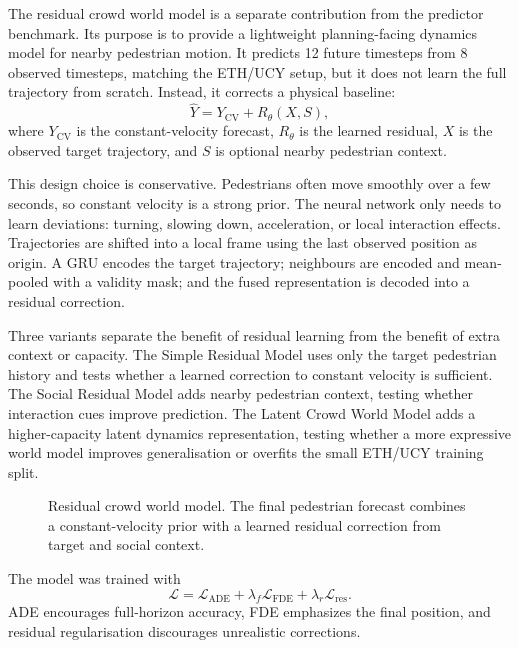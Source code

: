 \documentclass[conference]{IEEEtran}
\begin{document}
The residual crowd world model is a separate contribution from the predictor
benchmark. Its purpose is to provide a lightweight planning-facing dynamics
model for nearby pedestrian motion. It predicts 12 future timesteps from 8
observed timesteps, matching the ETH/UCY setup, but it does not learn the full
trajectory from scratch. Instead, it corrects a physical baseline:
\begin{equation}
\hat{Y}=Y_{\text{CV}}+R_\theta(X,S),
\label{eq:residual_model}
\end{equation}
where $Y_{\text{CV}}$ is the constant-velocity forecast, $R_\theta$ is the
learned residual, $X$ is the observed target trajectory, and $S$ is optional
nearby pedestrian context.

This design choice is conservative. Pedestrians often move
smoothly over a few seconds, so constant velocity is a strong prior. The neural
network only needs to learn deviations: turning, slowing down, acceleration,
or local interaction effects. Trajectories are shifted into a local frame using
the last observed position as origin. A GRU encodes the target trajectory;
neighbours are encoded and mean-pooled with a validity mask; and the fused
representation is decoded into a residual correction.

Three variants separate the benefit of residual learning from
the benefit of extra context or capacity. The Simple Residual Model uses only
the target pedestrian history and tests whether a learned correction to constant
velocity is sufficient. The Social Residual Model adds nearby pedestrian
context, testing whether interaction cues improve prediction. The Latent Crowd
World Model adds a higher-capacity latent dynamics representation, testing
whether a more expressive world model improves generalisation or overfits the
small ETH/UCY training split.

\begin{figure}[t]
  \centering
  \resizebox{0.82\columnwidth}{!}{}
  \caption{Residual crowd world model. The final pedestrian forecast combines a
  constant-velocity prior with a learned residual correction from target and
  social context.}
  \label{fig:world_model}
\end{figure}

The model was trained with
\begin{equation}
\mathcal{L}
=
\mathcal{L}_{\text{ADE}}
+ \lambda_f \mathcal{L}_{\text{FDE}}
+ \lambda_r \mathcal{L}_{\text{res}} .
\end{equation}
ADE encourages full-horizon accuracy, FDE emphasizes the final position, and
residual regularisation discourages unrealistic corrections.
\end{document}
